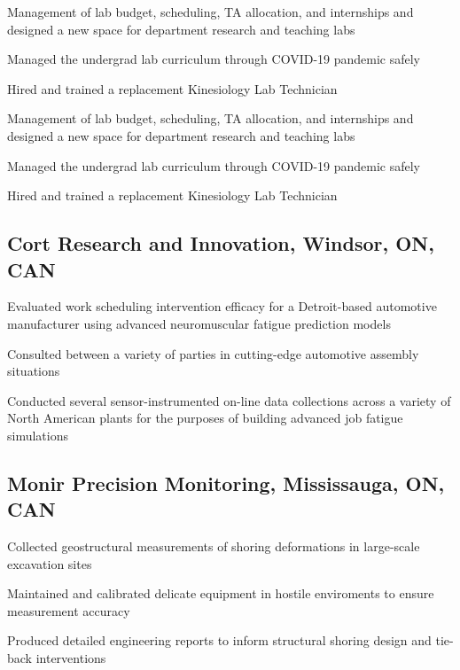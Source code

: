\documentclass[11pt,a4paper,sans]{moderncv} %
\begin{document}

{\item Management of lab budget, scheduling, TA allocation, and internships and designed a new space for department research and teaching labs
\item Managed the undergrad lab curriculum through COVID-19 pandemic safely
\item Hired and trained a replacement Kinesiology Lab Technician}

{\item Management of lab budget, scheduling, TA allocation, and internships and designed a new space for department research and teaching labs
\item Managed the undergrad lab curriculum through COVID-19 pandemic safely
\item Hired and trained a replacement Kinesiology Lab Technician}

\subsection{Cort Research and Innovation, Windsor, ON, CAN}
{\item Evaluated work scheduling intervention efficacy for a Detroit-based automotive manufacturer using advanced neuromuscular fatigue prediction models
\item Consulted between a variety of parties in cutting-edge automotive assembly situations
\item Conducted several sensor-instrumented on-line data collections across a variety of North American plants for the purposes of building advanced job fatigue simulations}

\subsection{Monir Precision Monitoring, Mississauga, ON, CAN}
{\item Collected geostructural measurements of shoring deformations in large-scale excavation sites
\item Maintained and calibrated delicate equipment in hostile enviroments to ensure measurement accuracy
\item Produced detailed engineering reports to inform structural shoring design and tie-back interventions}
\end{document}
